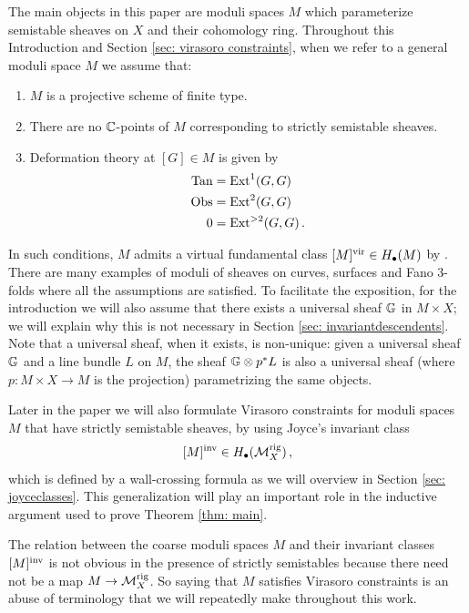 \documentclass[a4paper, 12pt]{amsart}
\begin{document}
The main objects in this paper are moduli spaces $M$ which parameterize semistable sheaves on $X$ and their cohomology ring. Throughout this Introduction and Section \ref{sec: virasoro constraints}, when we refer to a general moduli space $M$ we assume that:
\begin{enumerate}
\item $M$ is a projective scheme of finite type. 
\item There are no ${\mathbb{C}}$-points of  $M$ corresponding to strictly semistable sheaves.
\item Deformation theory at $[G]\in M$ is given by
\begin{align*}
\textup{Tan}&=\textup{Ext}^1(G,G)\\
\textup{Obs}&=\textup{Ext}^2(G,G)\\
0&=\textup{Ext}^{>2}(G,G)\,.
\end{align*}
\end{enumerate}


In such conditions, $M$ admits a virtual fundamental class $[M]^{\mathrm{vir}}\in H_\bullet(M)$ by \cite{BF}. There are many examples of moduli of sheaves on curves, surfaces and Fano 3-folds where all the assumptions are satisfied. To facilitate the exposition, for the introduction we will also assume that there exists a universal sheaf ${\mathbb{G}}$ in $M\times X$; we will explain why this is not necessary in Section \ref{sec: invariantdescendents}. Note that a universal sheaf, when it exists, is non-unique: given a universal sheaf ${\mathbb{G}}$ and a line bundle $L$ on $M$, the sheaf ${\mathbb{G}}\otimes p^\ast L$ is also a universal sheaf (where $p\colon M\times X\to M$ is the projection) parametrizing the same objects.

Later in the paper we will also formulate Virasoro constraints for moduli spaces $M$ that have strictly semistable sheaves, by using Joyce's invariant class 
\[[M]^{\mathrm{inv}} \in H_\bullet({\mathcal M}_X^{\mathrm{rig}})\,,\]
which is defined by a wall-crossing formula as we will overview in Section \ref{sec: joyceclasses}. This generalization will play an important role in the inductive argument used to prove Theorem \ref{thm: main}.
\begin{remark}
\label{rem:nocoarsedirect}
    The relation between the coarse moduli spaces $M$ and their invariant classes $[M]^{\mathrm{inv}}$ is not obvious in the presence of strictly semistables because there need not be a map $M\to {\mathcal M}_X^{\mathrm{rig}}$. So saying that $M$ satisfies Virasoro constraints is an abuse of terminology that we will repeatedly make throughout this work. 
\end{remark}
\end{document}
